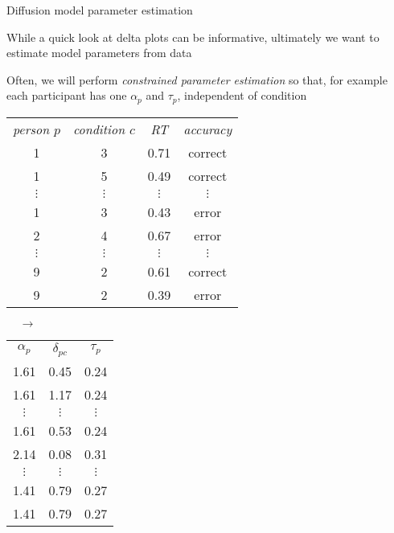 \documentclass[aspectratio=169]{beamer}
\begin{document}
\begin{frame}[fragile]{Diffusion model parameter estimation}

While a quick look at delta plots can be informative, ultimately we want to estimate model parameters from data\\[2ex]\pause

Often, we will perform \emph{constrained parameter estimation} so that, for example each participant has one $\alpha_p$ and $\tau_p$, independent of condition\\[3ex]\pause

 \centering
\begin{minipage}{.58\textwidth}
\begin{tabular}{|cccc|}
\rowcolor{black}
{\it\color{white}person $p$} & {\it\color{white}condition $c$} & {\it\color{white}RT} & {\it\color{white}accuracy}       \\ 
1 & 3 & 0.71 & correct \\
1 & 5 & 0.49 & correct \\
$\vdots$ & $\vdots$ & $\vdots$ & $\vdots$ \\
1 & 3 & 0.43 & error \\
2 & 4 & 0.67 & error \\
$\vdots$ & $\vdots$ & $\vdots$ & $\vdots$ \\
9 & 2 & 0.61 & correct \\
9 & 2 & 0.39 & error \\\hline
\end{tabular}
\end{minipage} $\;\;\;\;\rightarrow\;\;$
\begin{minipage}{.3\textwidth}
\begin{tabular}{|ccc|}
\rowcolor{black}
{\it\color{white}$\alpha_p$} & {\it\color{white}$\delta_{pc}$} & {\it\color{white}$\tau_p$}       \\ 
1.61 & 0.45 & 0.24   \\
1.61 & 1.17 & 0.24   \\
$\vdots$ & $\vdots$ & $\vdots$ \\
1.61 & 0.53 & 0.24   \\
2.14 & 0.08 & 0.31   \\
$\vdots$ & $\vdots$ & $\vdots$ \\
1.41 & 0.79 & 0.27   \\
1.41 & 0.79 & 0.27   \\\hline
\end{tabular}
\end{minipage}

\end{frame}
\end{document}
